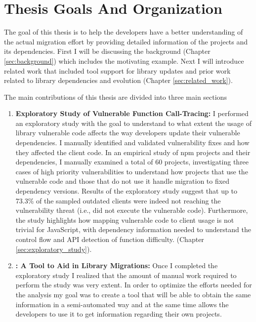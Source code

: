 \section{Thesis Goals And Organization}
The goal of this thesis is to help the developers have a better understanding of the actual migration effort by providing detailed information of the projects and its dependencies.
First I will be discussing the background (Chapter \ref{sec:background}) which includes the motivating example. 
Next I will introduce related work that included tool support for library updates and prior work related to library dependencies and evolution (Chapter \ref{sec:related_work}).


The main contributions of this thesis are divided into three main sections
\begin{enumerate}
    \item \textbf{Exploratory Study of Vulnerable Function Call-Tracing:} I performed an exploratory study with the goal to understand to what extent the usage of library vulnerable code affects the way developers update their vulnerable dependencies. 
    I manually identified and validated vulnerability fixes and how they affected the client code. 
    In an empirical study of npm projects and their dependencies, I manually examined a total of 60 projects, investigating three cases of high priority vulnerabilities to understand how projects that use the vulnerable code and those that do not use it handle migration to fixed dependency versions. 
    Results of the exploratory study suggest that up to 73.3\% of the sampled outdated clients were indeed not reaching the vulnerability threat (i.e., did not execute the vulnerable code). 
    Furthermore, the study highlights how mapping vulnerable code to client usage is not trivial for JavaScript, with dependency information needed to understand the control flow and API detection of function difficulty. (Chapter \ref{sec:exploratory_study}).
    \item \textbf{\tool[]: A Tool to Aid in Library Migrations:} Once I completed the exploratory study I realized that the amount of manual work required to perform the study was very extent. In order to optimize the efforts needed for the analysis my goal was to create a tool that will be able to obtain the same information in a semi-automated way and at the same time allows the developers to use it to get information regarding their own projects. 

\end{enumerate}
